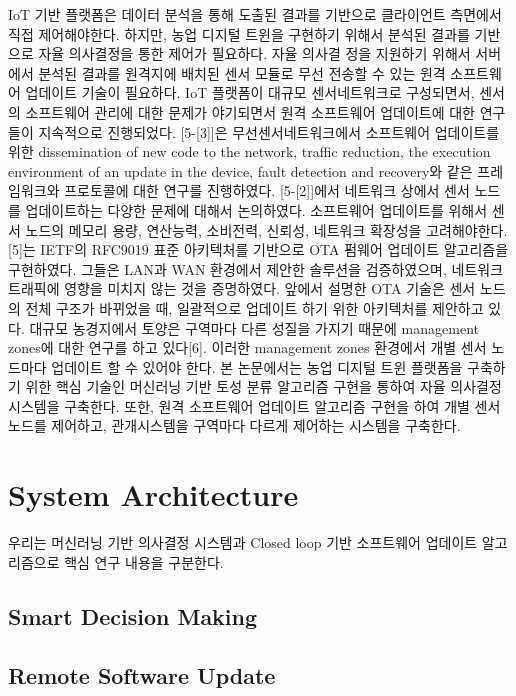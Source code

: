 \documentclass[11pt]{article}
\begin{document}
IoT 기반 플랫폼은 데이터 분석을 통해 도출된 결과를 기반으로 클라이언트 측면에서 직접 제어해야한다. 하지만, 농업 디지털 트윈을 구현하기 위해서 분석된 결과를 기반으로 자율 의사결정을 통한 제어가 필요하다. 자율 의사결 정을 지원하기 위해서 서버에서 분석된 결과를 원격지에 배치된 센서 모듈로 무선 전송할 수 있는 원격 소프트웨어 업데이트 기술이 필요하다. IoT 플랫폼이 대규모 센서네트워크로 구성되면서, 센서의 소프트웨어 관리에 대한 문제가 야기되면서 원격 소프트웨어 업데이트에 대한 연구들이 지속적으로 진행되었다.
[5-[3]]은 무선센서네트워크에서 소프트웨어 업데이트를 위한 dissemination of new code to the network, traffic reduction, the execution environment of an update in the device, fault detection and recovery와 같은 프레임워크와 프로토콜에 대한 연구를 진행하였다. [5-[2]]에서 네트워크 상에서 센서 노드를 업데이트하는 다양한 문제에 대해서 논의하였다. 소프트웨어 업데이트를 위해서 센서 노드의 메모리 용량, 연산능력, 소비전력, 신뢰성, 네트워크 확장성을 고려해야한다. [5]는 IETF의 RFC9019 표준 아키텍처를 기반으로 OTA 펌웨어 업데이트 알고리즘을 구현하였다. 그들은 LAN과 WAN 환경에서 제안한 솔루션을 검증하였으며, 네트워크 트래픽에 영향을 미치지 않는 것을 증명하였다. 앞에서 설명한 OTA 기술은 센서 노드의 전체 구조가 바뀌었을 때, 일괄적으로 업데이트 하기 위한 아키텍처를 제안하고 있다. 대규모 농경지에서 토양은 구역마다 다른 성질을 가지기 때문에 management zones에 대한 연구를 하고 있다[6]. 이러한 management zones 환경에서 개별 센서 노드마다 업데이트 할 수 있어야 한다. 본 논문에서는 농업 디지털 트윈 플랫폼을 구축하기 위한 핵심 기술인 머신러닝 기반 토성 분류 알고리즘 구현을 통하여 자율 의사결정 시스템을 구축한다. 또한, 원격 소프트웨어 업데이트 알고리즘 구현을 하여 개별 센서 노드를 제어하고, 관개시스템을 구역마다 다르게 제어하는 시스템을 구축한다.

\section{System Architecture}
우리는 머신러닝 기반 의사결정 시스템과 Closed loop 기반 소프트웨어 업데이트 알고리즘으로 핵심 연구 내용을 구분한다.

\subsection{Smart Decision Making}

\subsection{Remote Software Update}
\end{document}
